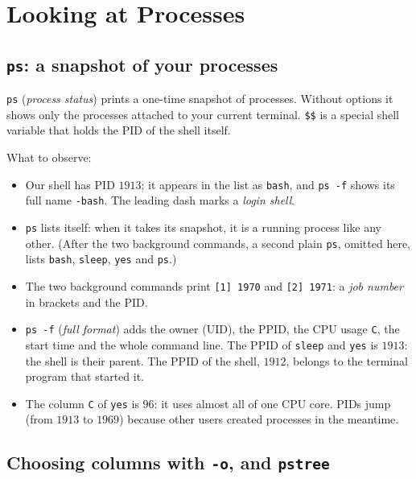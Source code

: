 \documentclass[11pt,a4paper]{article}
\newcommand{\cmd}[1]{\texttt{#1}}
\begin{document}
\section{Looking at Processes}
\label{sec:ps}

\subsection{\texttt{ps}: a snapshot of your processes}

\cmd{ps} (\emph{process status}) prints a one-time snapshot of processes. Without options it shows only the processes attached to your current terminal. \verb|$$| is a special shell variable that holds the PID of the shell itself.



What to observe:
\begin{itemize}
  \item Our shell has PID $1913$; it appears in the list as \texttt{bash}, and \cmd{ps -f} shows its full name \texttt{-bash}. The leading dash marks a \emph{login shell}.
  \item \cmd{ps} lists itself: when it takes its snapshot, it is a running process like any other. (After the two background commands, a second plain \cmd{ps}, omitted here, lists \texttt{bash}, \texttt{sleep}, \texttt{yes} and \texttt{ps}.)
  \item The two background commands print \texttt{[1] 1970} and \texttt{[2] 1971}: a \emph{job number} in brackets and the PID.
  \item \cmd{ps -f} (\emph{full format}) adds the owner (UID), the PPID, the CPU usage \texttt{C}, the start time and the whole command line. The PPID of \cmd{sleep} and \cmd{yes} is $1913$: the shell is their parent. The PPID of the shell, $1912$, belongs to the terminal program that started it.
  \item The column \texttt{C} of \cmd{yes} is $96$: it uses almost all of one CPU core. PIDs jump (from $1913$ to $1969$) because other users created processes in the meantime.
\end{itemize}

\subsection{Choosing columns with \texttt{-o}, and \texttt{pstree}}
\end{document}
